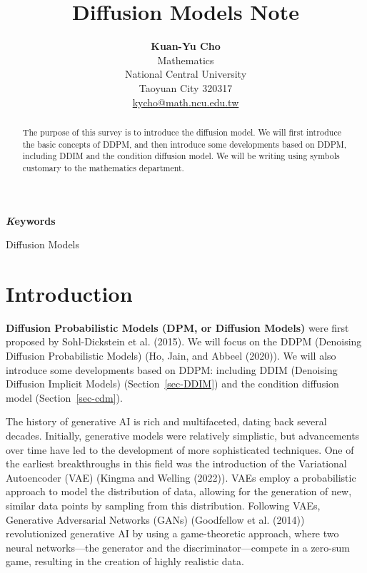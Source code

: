 \documentclass[
]{article}
\title{Diffusion Models Note}
\author{\textbf{Kuan-Yu Cho}\\Mathematics\\National Central
University\\Taoyuan City
320317\\\href{mailto:kycho@math.ncu.edu.tw}{kycho@math.ncu.edu.tw}}
\date{}
\theoremstyle{remark}
\begin{document}
\maketitle
\begin{abstract}
The purpose of this survey is to introduce the diffusion model. We will
first introduce the basic concepts of DDPM, and then introduce some
developments based on DDPM, including DDIM and the condition diffusion
model. We will be writing using symbols customary to the mathematics
department.
\end{abstract}
{\bfseries \emph Keywords}
\def\sep{\textbullet\ }

Diffusion Models


\renewcommand{\Return}{\State \textbf{return}~}
          \newcommand{\Print}{\State \textbf{print}~}
          \newcommand{\Break}{\State \textbf{break}}
          \newcommand{\Continue}{\State \textbf{continue}}
          \newcommand{\True}{\textbf{true}}
          \newcommand{\False}{\textbf{false}}
          \renewcommand{\And}{\textbf{and}~}
          \newcommand{\Or}{\textbf{or}~}
          \renewcommand{\Not}{\textbf{not}~}
          \newcommand{\To}{\textbf{to}~}
          \newcommand{\DownTo}{\textbf{downto}~}



\section{Introduction}\label{introduction}

\textbf{Diffusion Probabilistic Models (DPM, or Diffusion Models)} were
first proposed by Sohl-Dickstein et al. (2015). We will focus on the
DDPM (Denoising Diffusion Probabilistic Models) (Ho, Jain, and Abbeel
(2020)). We will also introduce some developments based on DDPM:
including DDIM (Denoising Diffusion Implicit Models)
(Section~\ref{sec-DDIM}) and the condition diffusion model
(Section~\ref{sec-cdm}).

The history of generative AI is rich and multifaceted, dating back
several decades. Initially, generative models were relatively
simplistic, but advancements over time have led to the development of
more sophisticated techniques. One of the earliest breakthroughs in this
field was the introduction of the Variational Autoencoder (VAE) (Kingma
and Welling (2022)). VAEs employ a probabilistic approach to model the
distribution of data, allowing for the generation of new, similar data
points by sampling from this distribution. Following VAEs, Generative
Adversarial Networks (GANs) (Goodfellow et al. (2014)) revolutionized
generative AI by using a game-theoretic approach, where two neural
networks---the generator and the discriminator---compete in a zero-sum
game, resulting in the creation of highly realistic data.
\end{document}
